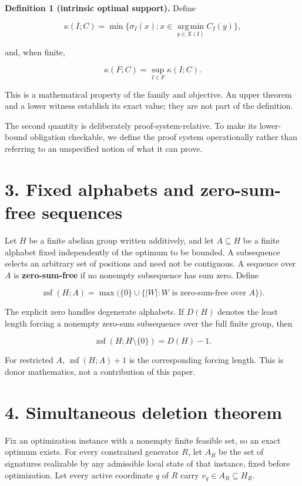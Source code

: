 \documentclass[11pt]{article}
\begin{document}
\textbf{Definition 1 (intrinsic optimal support).} Define

\[
\kappa(I;C)
=
\min\{\sigma_I(x):x\in\operatorname*{arg\,min}_{y\in X(I)} C_I(y)\},
\]

and, when finite,

\[
\kappa(F;C)=\sup_{I\in F}\kappa(I;C).
\]

This is a mathematical property of the family and objective. An upper theorem and a lower witness establish its exact value; they are not part of the definition.

The second quantity is deliberately proof-system-relative. To make its lower-bound obligation checkable, we define the proof system operationally rather than referring to an unspecified notion of what it can prove.

\section*{3. Fixed alphabets and zero-sum-free sequences}\label{fixed-alphabets-and-zero-sum-free-sequences}

Let \(H\) be a finite abelian group written additively, and let \(A\subseteq H\) be a finite alphabet fixed independently of the optimum to be bounded. A subsequence selects an arbitrary set of positions and need not be contiguous. A sequence over \(A\) is \textbf{zero-sum-free} if no nonempty subsequence has sum zero. Define

\[
\operatorname{zsf}(H;A)
=
\max\bigl(\{0\}\cup\{|W|:W\text{ is zero-sum-free over }A\}\bigr).
\]

The explicit zero handles degenerate alphabets. If \(D(H)\) denotes the least length forcing a nonempty zero-sum subsequence over the full finite group, then

\[
\operatorname{zsf}(H;H\setminus\{0\})=D(H)-1.
\]

For restricted \(A\), \(\operatorname{zsf}(H;A)+1\) is the corresponding forcing length. This is donor mathematics, not a contribution of this paper.

\section*{4. Simultaneous deletion theorem}\label{simultaneous-deletion-theorem}

Fix an optimization instance with a nonempty finite feasible set, so an exact optimum exists. For every constrained generator \(R\), let \(A_R\) be the set of signatures realizable by any admissible local state of that instance, fixed before optimization. Let every active coordinate \(q\) of \(R\) carry \(v_q\in A_R\subseteq H_R\).
\end{document}
